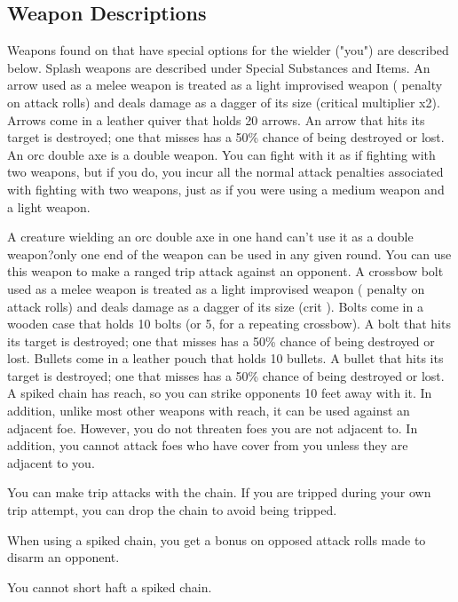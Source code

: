 \subsection{Weapon Descriptions}
Weapons found on  that have special options for the wielder ("you") are described below. Splash weapons are described under Special Substances and Items.
 An arrow used as a melee weapon is treated as a light improvised weapon ( penalty on attack rolls) and deals damage as a dagger of its size (critical multiplier x2). Arrows come in a leather quiver that holds 20 arrows. An arrow that hits its target is destroyed; one that misses has a 50\% chance of being destroyed or lost.
 An orc double axe is a double weapon. You can fight with it as if fighting with two weapons, but if you do, you incur all the normal attack penalties associated with fighting with two weapons, just as if you were using a medium weapon and a light weapon.
\par A creature wielding an orc double axe in one hand can't use it as a double weapon?only one end of the weapon can be used in any given round.
 You can use this weapon to make a ranged trip attack against an opponent.
 A crossbow bolt used as a melee weapon is treated as a light improvised weapon ( penalty on attack rolls) and deals damage as a dagger of its size (crit ). Bolts come in a wooden case that holds 10 bolts (or 5, for a repeating crossbow). A bolt that hits its target is destroyed; one that misses has a 50\% chance of being destroyed or lost.
 Bullets come in a leather pouch that holds 10 bullets. A bullet that hits its target is destroyed; one that misses has a 50\% chance of being destroyed or lost.
 A spiked chain has reach, so you can strike opponents 10 feet away with it. In addition, unlike most other weapons with reach, it can be used against an adjacent foe. However, you do not threaten foes you are not adjacent to. In addition, you cannot attack foes who have cover from you unless they are adjacent to you.
\par You can make trip attacks with the chain. If you are tripped during your own trip attempt, you can drop the chain to avoid being tripped.
\par When using a spiked chain, you get a  bonus on opposed attack rolls made to disarm an opponent.
\par You cannot short haft a spiked chain.


